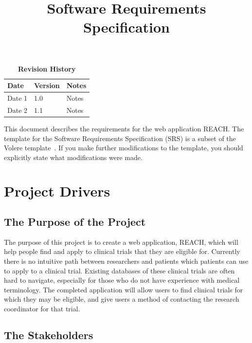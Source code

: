\documentclass[12pt, titlepage]{article}
\title{Software Requirements Specification\\\progname}
\author{\authname}
\date{}
\begin{document}
\maketitle

\tableofcontents
\listoftables
\listoffigures

\begin{table}[bp]
\caption{\bf Revision History}
\begin{tabularx}{\textwidth}{p{3cm}p{2cm}X}
\toprule {\bf Date} & {\bf Version} & {\bf Notes}\\
\midrule
Date 1 & 1.0 & Notes\\
Date 2 & 1.1 & Notes\\
\bottomrule
\end{tabularx}
\end{table}

\newpage


This document describes the requirements for the web application REACH. The template for the Software
Requirements Specification (SRS) is a subset of the Volere
template~\citep{RobertsonAndRobertson2012}.  If you make further modifications
to the template, you should explicitly state what modifications were made.

\section{Project Drivers}

\subsection{The Purpose of the Project}

The purpose of this project is to create a web application, REACH, which will help people find and apply to clinical trials that they are eligible for. Currently there is no intuitive path between researchers and patients which patients can use to apply to a clinical trial. Existing databases of these clinical trials are often hard to navigate, especially for those who do not have experience with medical terminology. The completed application will allow users to find clinical trials for which they may be eligible, and give users a method of contacting the research coordinator for that trial.

\subsection{The Stakeholders}
\end{document}
